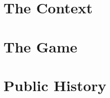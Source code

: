 \documentclass[12pt, twoside, openright]{memoir}
\begin{document}
\cleardoublepage
\tableofcontents

\part{The Context}


\part{The Game}







\part{Public History}


\appendix




\end{document}

